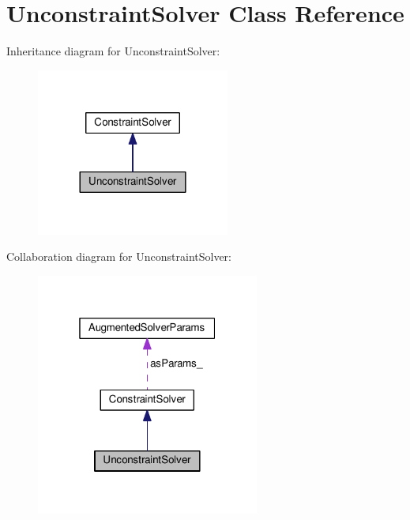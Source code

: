 \hypertarget{classUnconstraintSolver}{\section{Unconstraint\-Solver Class Reference}
\label{classUnconstraintSolver}
}


Inheritance diagram for Unconstraint\-Solver\-:
\nopagebreak
\begin{figure}[H]
\begin{center}
\leavevmode
\includegraphics[width=180pt]{classUnconstraintSolver__inherit__graph}
\end{center}
\end{figure}


Collaboration diagram for Unconstraint\-Solver\-:
\nopagebreak
\begin{figure}[H]
\begin{center}
\leavevmode
\includegraphics[width=208pt]{classUnconstraintSolver__coll__graph}
\end{center}
\end{figure}
